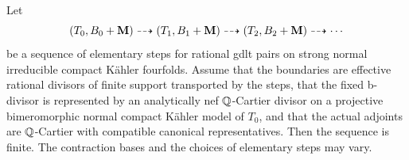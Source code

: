 \begin{theorem}\label{thm:gdlt}
Let
\[
 (T_0,B_0+\mathbf{M})\dashrightarrow(T_1,B_1+\mathbf{M})
 \dashrightarrow(T_2,B_2+\mathbf{M})\dashrightarrow\cdots
\]
be a sequence of elementary steps for rational gdlt pairs on strong normal irreducible
compact K\"ahler fourfolds.  Assume that the boundaries are effective
rational divisors of finite support transported by the steps, that the
fixed b-divisor is represented by an analytically nef \(\mathbb{Q}\)-Cartier divisor
on a projective bimeromorphic normal compact K\"ahler model of \(T_0\), and
that the actual adjoints are \(\mathbb{Q}\)-Cartier with compatible canonical
representatives.  Then the sequence is finite.  The contraction bases and
the choices of elementary steps may vary.
\end{theorem}

